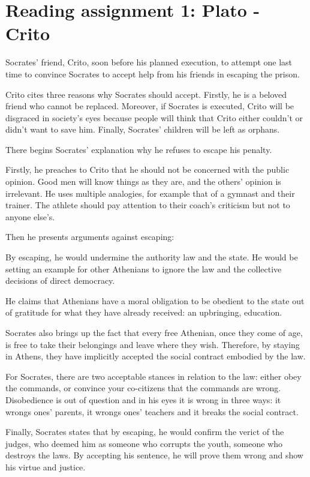 \section{Reading assignment 1: Plato - Crito}

Socrates' friend, Crito, soon before his planned execution, to attempt one last
time to convince Socrates to accept help from his friends in escaping the
prison.

Crito cites three reasons why Socrates should accept. Firstly, he is a beloved
friend who cannot be replaced. Moreover, if Socrates is executed, Crito will
be disgraced in society's eyes because people will think that Crito either
couldn't or didn't want to save him. Finally, Socrates' children will be left
as orphans.

There begins Socrates' explanation why he refuses to escape his penalty.

Firstly, he preaches to Crito that he should not be concerned with the public
opinion. Good men will know things as they are, and the others' opinion is
irrelevant. He uses multiple analogies, for example that of a gymnast and their
trainer. The athlete should pay attention to their coach's criticism but not
to anyone else's.

Then he presents arguments against escaping:

By escaping, he would undermine the authority law and the state. He would be 
setting an example for other Athenians to ignore the law and the collective
decisions of direct democracy.

He claims that Athenians have a moral obligation to be obedient to the state
out of gratitude for what they have already received: an upbringing, education.

Socrates also brings up the fact that every free Athenian, once they come of
age, is free to take their belongings and leave where they wish. Therefore,
by staying in Athens, they have implicitly accepted the social contract
embodied by the law.

For Socrates, there are two acceptable stances in relation to the law:
either obey the commands, or convince your co-citizens that the commands are
wrong. Disobedience is out of question and in his eyes it is wrong in three
ways: it wrongs ones' parents, it wrongs ones' teachers and it breaks the
social contract.

Finally, Socrates states that by escaping, he would confirm the verict of
the judges, who deemed him as someone who corrupts the youth, someone who
destroys the laws. By accepting his sentence, he will prove them wrong and show
his virtue and justice.

